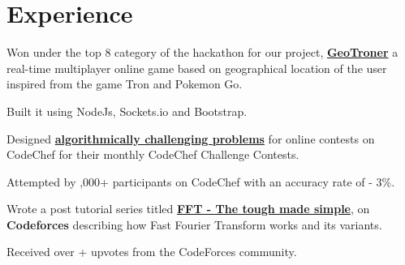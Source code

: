 \documentclass[]{sidhant-resume}
\begin{document}
\hfill
\begin{minipage}[t]{0.65\textwidth} 


\section{Experience}

\descript{}
\vspace{\topsep} %
\vspace{\topsep} %
\vspace{\topsep} %
\begin{tightemize}
\item Won under the top 8 category of the hackathon for our project, \textcolor{black}{\textbf{\href{https://devpost.com/software/geotroner}{GeoTroner}}} a real-time multiplayer online game based on geographical location of the user inspired from the game Tron and Pokemon Go.
\item Built it using NodeJs, Sockets.io and Bootstrap.
\end{tightemize}
\sectionsep

\vspace{\topsep} %
\vspace{\topsep} %
\vspace{\topsep} %
\begin{tightemize}
\item Designed \textcolor{black}{\textbf{\href{https://www.codechef.com/tags/problems/sidhant007}{algorithmically challenging problems}}}  for online contests on CodeChef for their monthly CodeChef Challenge Contests.
\item Attempted by {,000+} participants on CodeChef with an accuracy rate of { - 3\%}.
\end{tightemize}
\sectionsep

\vspace{\topsep} %
\vspace{\topsep} %
\begin{tightemize}
\item Wrote a {} post tutorial series titled \textcolor{black}{\textbf{\href{http://codeforces.com/blog/entry/43499}{FFT - The tough made simple}}}, on \textbf{Codeforces} describing how Fast Fourier Transform works and its variants.
\item Received over {+} upvotes from the CodeForces community.
\end{tightemize}
\sectionsep


\end{minipage}
\end{document}

